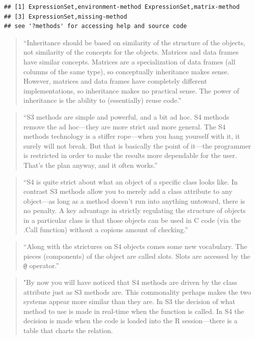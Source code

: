 \documentclass[]{tufte-book}
\begin{document}
\begin{verbatim}
## [1] ExpressionSet,environment-method ExpressionSet,matrix-method     
## [3] ExpressionSet,missing-method    
## see '?methods' for accessing help and source code
\end{verbatim}

\begin{quote}
``Inheritance should be based on similarity of the structure of the objects,
not similarity of the concepts for the objects. Matrices and data frames have
similar concepts. Matrices are a specialization of data frames (all columns of the
same type), so conceptually inheritance makes sense. However, matrices and
data frames have completely different implementations, so inheritance makes
no practical sense. The power of inheritance is the ability to (essentially) reuse
code.'' \citep{burns2011r}
\end{quote}

\begin{quote}
``S3 methods are simple and powerful, and a bit ad hoc. S4 methods remove
the ad hoc---they are more strict and more general. The S4 methods technology
is a stiffer rope---when you hang yourself with it, it surely will not break. But
that is basically the point of it---the programmer is restricted in order to make
the results more dependable for the user. That's the plan anyway, and it often
works.'' \citep{burns2011r}
\end{quote}

\begin{quote}
``S4 is quite strict about what an object of a specific class looks like. In contrast
S3 methods allow you to merely add a class attribute to any object---as long
as a method doesn't run into anything untoward, there is no penalty. A key
advantage in strictly regulating the structure of objects in a particular class is
that those objects can be used in C code (via the .Call function) without a
copious amount of checking.'' \citep{burns2011r}
\end{quote}

\begin{quote}
``Along with the strictures on S4 objects comes some new vocabulary. The
pieces (components) of the object are called slots. Slots are accessed by the \texttt{@}
operator.'' \citep{burns2011r}
\end{quote}

\begin{quote}
"By now you will have noticed that S4 methods are driven by the class
attribute just as S3 methods are. This commonality perhaps makes the two
systems appear more similar than they are. In S3 the decision of what method
to use is made in real-time when the function is called. In S4 the decision is
made when the code is loaded into the R session---there is a table that charts
the relation. \citep{burns2011r}
\end{quote}
\end{document}
